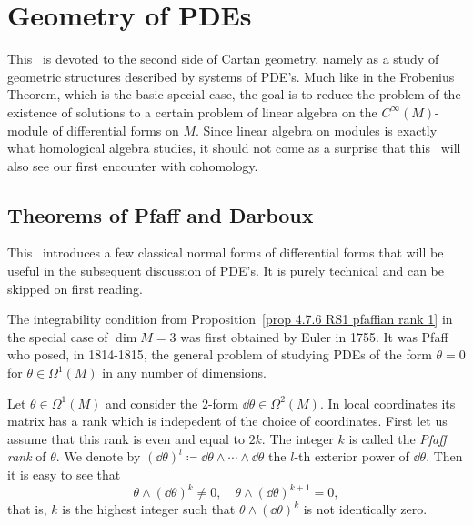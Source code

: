 















\newpage
\section{Geometry of PDEs}\label{sec: PDEs}


This \sect\ is devoted to the second side of Cartan geometry, namely as a study of geometric structures described by systems of PDE's. Much like in the Frobenius Theorem, which is the basic special case, the goal is to reduce the problem of the existence of solutions to a certain problem of linear algebra on the $C^\infty(M)$-module of differential forms on $M$. Since linear algebra on modules is exactly what homological algebra studies, it should not come as a surprise that this \sect\ will also see our first encounter with cohomology.



\subsection{Theorems of Pfaff and Darboux}

This \subsect\ introduces a few classical normal forms of differential forms that will be useful in the subsequent discussion of PDE's. It is purely technical and can be skipped on first reading.

The integrability condition from Proposition~\ref{prop 4.7.6 RS1 pfaffian rank 1} in the special case of $\dim M=3$ was first obtained by Euler in 1755. It was Pfaff who posed, in 1814-1815, the general problem of studying PDEs of the form $\theta=0$ for $\theta\in\Omega^1(M)$ in any number of dimensions.

Let $\theta\in\Omega^1(M)$ and consider the $2$-form $\dd\theta\in\Omega^2(M)$. In local coordinates its matrix has a rank which is indepedent of the choice of coordinates. First let us assume that this rank is even and equal to $2k$. The integer $k$ is called the \emph{Pfaff rank} of $\theta$. We denote by $(\dd\theta)^l\coloneqq \dd\theta\wedge\cdots\wedge\dd\theta$ the $l$-th exterior power of $\dd\theta$. Then it is easy to see that 
\[\theta\wedge(\dd\theta)^{k}\neq 0,\quad \theta\wedge(\dd\theta)^{k+1}=0,\]
that is, $k$ is the highest integer such that $\theta\wedge(\dd\theta)^{k}$ is not identically zero. 


